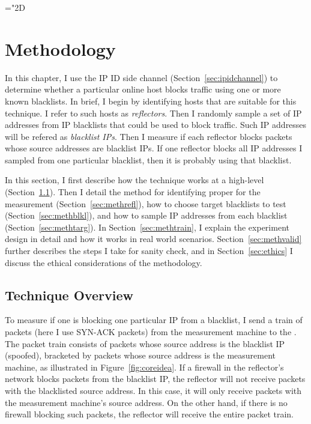 \mathchardef\mhyphen="2D %

\section{Methodology}
\label{sec:methodology}

In this chapter, I use the IP ID side channel (Section~\ref{sec:ipidchannel})
to determine whether a particular online host blocks traffic using one
or more known blacklists. In brief, I begin by identifying hosts that are
suitable for this technique. I refer to such hosts as
\emph{reflectors}. Then I randomly sample a set of IP addresses
from IP blacklists that could be used to block traffic. Such IP addresses 
will be refered as \emph{blacklist IPs}. Then I measure if
each reflector blocks packets whose source addresses are blacklist
IPs. If one reflector blocks all IP addresses I sampled
from one particular blacklist, then it is probably using that blacklist.

In this section, I first describe how the technique works at a
high-level (Section~\ref{sec:meththeory}). Then I detail
the method for identifying proper {} for the
measurement (Section~\ref{sec:methrefl}), how to choose target blacklists 
to test (Section~\ref{sec:methblkl}), and how to sample IP addresses from 
each blacklist (Section~\ref{sec:methtarg}). In Section~\ref{sec:methtrain}, 
I explain the experiment design in detail and how it works in
real world scenarios. Section~\ref{sec:methvalid} further describes the steps
I take for sanity check, and in Section~\ref{sec:ethics} I discuss the
ethical considerations of the methodology.

\subsection{Technique Overview}
\label{sec:meththeory}

To measure if one {} is blocking one particular IP from a blacklist,
I send a train of packets (here I use SYN-ACK packets)
from the measurement machine to the {}. The packet train consists
of packets whose source address is the blacklist IP (spoofed),
bracketed by packets whose source address is the measurement machine,
as illustrated in Figure~\ref{fig:coreidea}. If a firewall in the
reflector's network blocks packets from the blacklist IP, the
reflector will not receive packets with the blacklisted source address. In
this case, it will only receive packets with the measurement machine's source
address. On the other hand, if there is no firewall blocking such packets, the
reflector will receive the entire packet train.

